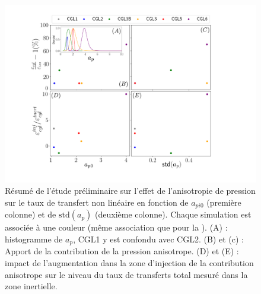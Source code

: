 \begin{figure}[!ht]
 \centering
 \includegraphics[width=1\linewidth,trim=3cm 1cm 5cm 1cm, clip=true]{./Part_3/images_ch3/scattersimu}
\cprotect\caption{Résumé de l'étude préliminaire sur l'effet de l'anisotropie de pression sur le taux de transfert non linéaire en fonction de $a_{pi0}$ (première colonne) et de $\text{std}(a_p)$ (deuxième colonne). Chaque simulation est associée à une couleur (même association que pour la ). (A) : histogramme de $a_p$, CGL1 y est confondu avec CGL2. (B) et (c) : Apport de la contribution de la pression anisotrope. (D) et (E) : impact de l'augmentation dans la zone d'injection de la contribution anisotrope sur le niveau du taux de transferts total mesuré dans la zone inertielle.}
\label{fig:scattersimu}
\end{figure}


